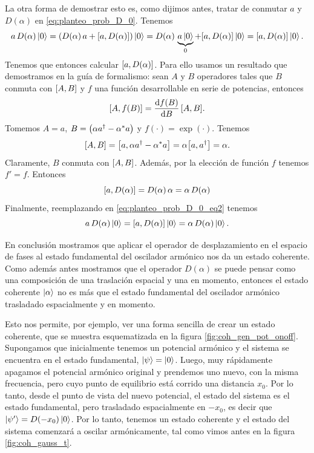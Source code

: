 \documentclass[10pt, a4paper]{article}
\numberwithin{equation}{subsection}
\begin{document}
La otra forma de demostrar esto es, como dijimos antes, tratar de conmutar $a$
y $D(\alpha)$ en \eqref{eq:planteo_prob_D_0}. Tenemos
\begin{equation} \label{eq:planteo_prob_D_0_eq2}
  a\,D(\alpha)\ket{0} = \left(D(\alpha)\,a + \comm{a}{D(\alpha)}\right)\ket{0}
  = D(\alpha)\,\underbrace{a\ket{0}}_{0} + \comm{a}{D(\alpha)}\ket{0}
  = \comm{a}{D(\alpha)}\ket{0}.
\end{equation}
Tenemos que entonces calcular $\comm{a}{D(\alpha)}$. Para ello usamos un
resultado que demostramos en la guía de formalismo: sean $A$ y $B$ operadores
tales que $B$ conmuta con $\comm{A}{B}$ y $f$ una función desarrollable en
serie de potencias, entonces
\begin{equation}
  \comm{A}{f(B)} = \dv{f(B)}{B} \,\comm{A}{B}.
\end{equation}
Tomemos $A = a$, $B = \left(\alpha a^\dagger - {{\alpha}^{*}}a\right)$ y
$f(\cdot) = \exp(\cdot)$. Tenemos
\begin{equation}
  \comm{A}{B} = \comm{a}{\alpha a^\dagger - \conj{\alpha}a} =
    \alpha\comm{a}{a^\dagger} = \alpha.
\end{equation}
Claramente, $B$ conmuta con $\comm{A}{B}$. Además, por la elección de función
$f$ tenemos $f' = f$. Entonces
\begin{equation}
  \comm{a}{D(\alpha)} = D(\alpha)\,\alpha = \alpha\,D(\alpha)
\end{equation}
Finalmente, reemplazando en \eqref{eq:planteo_prob_D_0_eq2} tenemos
\begin{equation}
  a\,D(\alpha)\ket{0} = \comm{a}{D(\alpha)}\ket{0} = \alpha\,D(\alpha)\ket{0}.
\end{equation}

\bigbreak

En conclusión mostramos que aplicar el operador de desplazamiento en el espacio
de fases al estado fundamental del oscilador armónico nos da un estado
coherente. Como además antes mostramos que el operador $D(\alpha)$ se puede
pensar como una composición de una traslación espacial y una en momento,
entonces el estado coherente $\ket{\alpha}$ no es más que el estado fundamental
del oscilador armónico trasladado espacialmente y en momento.

Esto nos permite, por ejemplo, ver una forma sencilla de crear un estado
coherente, que se muestra esquematizada en la figura
\ref{fig:coh_gen_pot_onoff}. Supongamos que inicialmente tenemos un potencial
armónico y el sistema se encuentra en el estado fundamental, $\ket{\psi} =
\ket{0}$. Luego, muy rápidamente apagamos el potencial armónico original y
prendemos uno nuevo, con la misma frecuencia, pero cuyo punto de equilibrio
está corrido una distancia $x_0$. Por lo tanto, desde el punto de vista del
nuevo potencial, el estado del sistema es el estado fundamental, pero
trasladado espacialmente en $-x_0$, es decir que $\ket{\psi'} =
D(-x_0)\ket{0}$. Por lo tanto, tenemos un estado coherente y el estado del
sistema comenzará a oscilar armónicamente, tal como vimos antes en la figura
\ref{fig:coh_gauss_t}.
\end{document}

